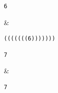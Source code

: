 \begin{sampleIO}
\begin{verbatim}
6
\end{verbatim}
&
\begin{verbatim}
(((((((6)))))))
\end{verbatim}
\end{sampleIO}



\begin{sampleIO}
\begin{verbatim}
7
\end{verbatim}
&
\begin{verbatim}
7
\end{verbatim}
\end{sampleIO}



